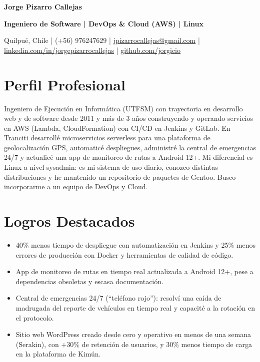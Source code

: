 \documentclass[10pt,letterpaper]{article}
\begin{document}
{\LARGE\bfseries Jorge Pizarro Callejas}\par\vspace{3pt}
{\large\bfseries Ingeniero de Software | DevOps \& Cloud (AWS) | Linux}\par\vspace{3pt}
Quilpué, Chile | (+56) 976247629 | \href{mailto:jpizarrocallejas@gmail.com}{jpizarrocallejas@gmail.com} | \href{https://linkedin.com/in/jorgepizarrocallejas}{linkedin.com/in/jorgepizarrocallejas} | \href{https://github.com/jorgicio}{github.com/jorgicio}\par

\section{Perfil Profesional}
Ingeniero de Ejecución en Informática (UTFSM) con trayectoria en desarrollo web y de software desde 2011 y más de 3 años construyendo y operando servicios en AWS (Lambda, CloudFormation) con CI/CD en Jenkins y GitLab. En Tranciti desarrollé microservicios serverless para una plataforma de geolocalización GPS, automaticé despliegues, administré la central de emergencias 24/7 y actualicé una app de monitoreo de rutas a Android 12+. Mi diferencial es Linux a nivel sysadmin: es mi sistema de uso diario, conozco distintas distribuciones y he mantenido un repositorio de paquetes de Gentoo. Busco incorporarme a un equipo de DevOps y Cloud.

\section{Logros Destacados}
\begin{itemize}
  \item 40\% menos tiempo de despliegue con automatización en Jenkins y 25\% menos errores de producción con Docker y herramientas de calidad de código.
  \item App de monitoreo de rutas en tiempo real actualizada a Android 12+, pese a dependencias obsoletas y escasa documentación.
  \item Central de emergencias 24/7 (``teléfono rojo''): resolví una caída de madrugada del reporte de vehículos en tiempo real y capacité a la rotación en el protocolo.
  \item Sitio web WordPress creado desde cero y operativo en menos de una semana (Serakin), con +30\% de retención de usuarios, y 30\% menos tiempo de carga en la plataforma de Kimún.
\end{itemize}
\end{document}

